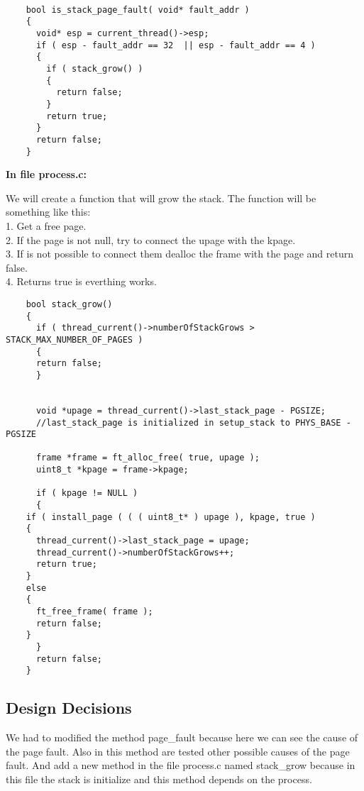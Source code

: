 \begin{lstlisting}

	bool is_stack_page_fault( void* fault_addr )
	{
	  void* esp = current_thread()->esp;
	  if ( esp - fault_addr == 32  || esp - fault_addr == 4 )
	  {
	    if ( stack_grow() )
	    {
	      return false;
	    }
	    return true;
	  }
	  return false;
	}

\end{lstlisting}


\textbf{In file process.c: }

We will create a function that will grow the stack. The function will be something like this:
      \\1. Get a free page. 
      \\2. If the page is not null, try to connect the  upage with the kpage.
      \\3. If is not possible to connect them dealloc the frame with the page and return false.
      \\4. Returns true is everthing works.

\begin{lstlisting}
    bool stack_grow()
    {
      if ( thread_current()->numberOfStackGrows > STACK_MAX_NUMBER_OF_PAGES )
      {
	  return false;
      }

      
      void *upage = thread_current()->last_stack_page - PGSIZE; 
      //last_stack_page is initialized in setup_stack to PHYS_BASE - PGSIZE

      frame *frame = ft_alloc_free( true, upage );
      uint8_t *kpage = frame->kpage;
 
      if ( kpage != NULL )
      {
	if ( install_page ( ( ( uint8_t* ) upage ), kpage, true )
	{
	  thread_current()->last_stack_page = upage;
	  thread_current()->numberOfStackGrows++;
	  return true;
	}
	else
	{
	  ft_free_frame( frame );
	  return false;
	}
      }
      return false;
    }

\end{lstlisting}


\subsection{Design Decisions}

We had to modified the method page\_fault because here we can see the cause of the page fault. Also in this method are tested other possible causes of the page fault. And add a new method in the file process.c named stack\_grow because in this file the stack is initialize and this method depends on the process.


